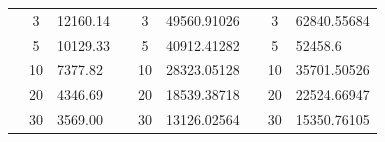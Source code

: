 \begin{table}[h]
\begin{tabular}{|cclcclccl|}
\rowcolor[HTML]{DAE8FC} 
\multicolumn{1}{|c|}{\cellcolor[HTML]{FFFFC7}}                                & \multicolumn{1}{c|}{\cellcolor[HTML]{DAE8FC}3}         & \multicolumn{1}{l|}{\cellcolor[HTML]{DAE8FC}12160.14}   & \multicolumn{1}{c|}{\cellcolor[HTML]{FFFFC7}}                                & \multicolumn{1}{c|}{\cellcolor[HTML]{DAE8FC}3}         & \multicolumn{1}{l|}{\cellcolor[HTML]{DAE8FC}49560.91026} & \multicolumn{1}{c|}{\cellcolor[HTML]{FFFFC7}}                                & \multicolumn{1}{c|}{\cellcolor[HTML]{DAE8FC}3}         & 62840.55684 \\ \cline{2-3} \cline{5-6} \cline{8-9} 
\rowcolor[HTML]{DDFDFF} 
\multicolumn{1}{|c|}{\cellcolor[HTML]{FFFFC7}}                                & \multicolumn{1}{c|}{\cellcolor[HTML]{DDFDFF}5}         & \multicolumn{1}{l|}{\cellcolor[HTML]{DDFDFF}10129.33}   & \multicolumn{1}{c|}{\cellcolor[HTML]{FFFFC7}}                                & \multicolumn{1}{c|}{\cellcolor[HTML]{DDFDFF}5}         & \multicolumn{1}{l|}{\cellcolor[HTML]{DDFDFF}40912.41282} & \multicolumn{1}{c|}{\cellcolor[HTML]{FFFFC7}}                                & \multicolumn{1}{c|}{\cellcolor[HTML]{DDFDFF}5}         & 52458.6     \\ \cline{2-3} \cline{5-6} \cline{8-9} 
\rowcolor[HTML]{DAE8FC} 
\multicolumn{1}{|c|}{\cellcolor[HTML]{FFFFC7}}                                & \multicolumn{1}{c|}{\cellcolor[HTML]{DAE8FC}10}        & \multicolumn{1}{l|}{\cellcolor[HTML]{DAE8FC}7377.82}    & \multicolumn{1}{c|}{\cellcolor[HTML]{FFFFC7}}                                & \multicolumn{1}{c|}{\cellcolor[HTML]{DAE8FC}10}        & \multicolumn{1}{l|}{\cellcolor[HTML]{DAE8FC}28323.05128} & \multicolumn{1}{c|}{\cellcolor[HTML]{FFFFC7}}                                & \multicolumn{1}{c|}{\cellcolor[HTML]{DAE8FC}10}        & 35701.50526 \\ \cline{2-3} \cline{5-6} \cline{8-9} 
\rowcolor[HTML]{DDFDFF} 
\multicolumn{1}{|c|}{\cellcolor[HTML]{FFFFC7}}                                & \multicolumn{1}{c|}{\cellcolor[HTML]{DDFDFF}20}        & \multicolumn{1}{l|}{\cellcolor[HTML]{DDFDFF}4346.69}    & \multicolumn{1}{c|}{\cellcolor[HTML]{FFFFC7}}                                & \multicolumn{1}{c|}{\cellcolor[HTML]{DDFDFF}20}        & \multicolumn{1}{l|}{\cellcolor[HTML]{DDFDFF}18539.38718} & \multicolumn{1}{c|}{\cellcolor[HTML]{FFFFC7}}                                & \multicolumn{1}{c|}{\cellcolor[HTML]{DDFDFF}20}        & 22524.66947 \\ \cline{2-3} \cline{5-6} \cline{8-9} 
\rowcolor[HTML]{DAE8FC} 
\multicolumn{1}{|c|}{\cellcolor[HTML]{FFFFC7}}                                & \multicolumn{1}{c|}{\cellcolor[HTML]{DAE8FC}30}        & \multicolumn{1}{l|}{\cellcolor[HTML]{DAE8FC}3569.00}    & \multicolumn{1}{c|}{\cellcolor[HTML]{FFFFC7}}                                & \multicolumn{1}{c|}{\cellcolor[HTML]{DAE8FC}30}        & \multicolumn{1}{l|}{\cellcolor[HTML]{DAE8FC}13126.02564} & \multicolumn{1}{c|}{\cellcolor[HTML]{FFFFC7}}                                & \multicolumn{1}{c|}{\cellcolor[HTML]{DAE8FC}30}        & 15350.76105 \\ \cline{2-3} \cline{5-6} \cline{8-9} 

\end{tabular}
\end{table}
